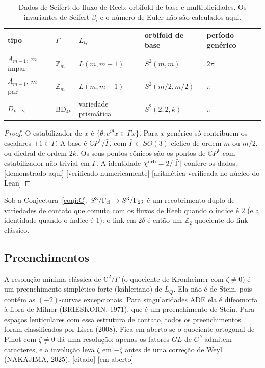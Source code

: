 \documentclass[11pt]{article}
\theoremstyle{definition}
\theoremstyle{remark}
\newcommand{\tagP}{\textsf{\small[demonstrado aqui]}}
\newcommand{\tagC}{\textsf{\small[citado]}}
\newcommand{\tagN}{\textsf{\small[verificado numericamente]}}
\newcommand{\tagK}{\textsf{\small[aritmética verificada no núcleo do Lean]}}
\newcommand{\tagO}{\textsf{\small\textcolor{red!70!black}{[em aberto]}}}
\newcommand{\C}{\mathbb{C}}\newcommand{\R}{\mathbb{R}}\newcommand{\Z}{\mathbb{Z}}
\newcommand{\BD}{\mathrm{BD}}
\begin{document}
\begin{table}[h]\centering\small
\begin{tabular}{@{}lllll@{}}\toprule
tipo & $\Gamma$ & $L_Q$ & orbifold de base & período genérico\\\midrule
$A_{m-1}$, $m$ ímpar & $\Z_m$ & $L(m,m-1)$ & $S^2(m,m)$ & $2\pi$\\
$A_{m-1}$, $m$ par & $\Z_m$ & $L(m,m-1)$ & $S^2(m/2,m/2)$ & $\pi$\\
$D_{k+2}$ & $\BD_{4k}$ & variedade prismática & $S^2(2,2,k)$ & $\pi$\\\bottomrule
\end{tabular}
\caption{Dados de Seifert do fluxo de Reeb: orbifold de base e multiplicidades. Os invariantes de Seifert $\beta_i$ e o número de Euler não são calculados aqui.}\label{tab:seifert}
\end{table}
\begin{proof}
O estabilizador de $x$ é $\{\theta: e^{i\theta}x\in\Gamma x\}$. Para $x$ genérico só contribuem os escalares $\pm1\in\Gamma$. A base é $\C P^1/\bar\Gamma$, com $\bar\Gamma\subset SO(3)$ cíclico de ordem $m$ ou $m/2$, ou diedral de ordem $2k$. Os seus pontos cônicos são os pontos de $\C P^1$ com estabilizador não trivial em $\bar\Gamma$. A identidade $\chi^{\rm orb}=2/|\bar\Gamma|$ confere os dados. \tagP{} \tagN{} \tagK
\end{proof}

Sob a Conjectura~\ref{conj:C}, $S^3/\Gamma_{\rm cl}\to S^3/\Gamma_{2\delta}$ é um recobrimento duplo de variedades de contato que comuta com os fluxos de Reeb quando o índice é $2$ (e a identidade quando o índice é $1$): o link em $2\delta$ é então um $\Z_2$-quociente do link clássico.

\subsection{Preenchimentos}
A resolução mínima clássica de $\C^2/\Gamma$ (o quociente de Kronheimer com $\zeta\ne0$) é um preenchimento simplético forte (kähleriano) de $L_Q$. Ela não é de Stein, pois contém as $(-2)$-curvas excepcionais. Para singularidades ADE ela é difeomorfa à fibra de Milnor (BRIESKORN, 1971), que é um preenchimento de Stein. Para espaços lenticulares com essa estrutura de contato, todos os preenchimentos foram classificados por Lisca (2008). Fica em aberto se o quociente ortogonal de Pinot com $\zeta\ne0$ dá uma resolução: apenas os fatores $GL$ de $G^b$ admitem caracteres, e a involução leva $\zeta$ em $-\zeta$ antes de uma correção de Weyl (NAKAJIMA, 2025). \tagC{} \tagO
\end{document}
